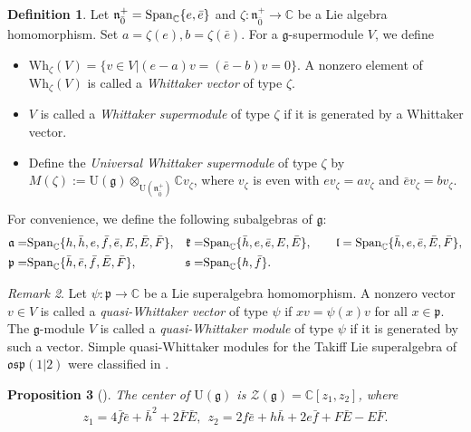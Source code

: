\documentclass[a4paper,10pt]{article}
\theoremstyle{definition}
\newtheorem{definition}{Definition}[section]
\theoremstyle{plain}
\newtheorem{proposition}[definition]{Proposition}
\theoremstyle{remark}
\newtheorem{remark}[definition]{Remark}
\theoremstyle{mystyle}
\numberwithin{equation}{section}
\begin{document}
\begin{definition} 
Let $\mathfrak n_{\bar 0}^+={\rm Span}_{\mathbb C}\{e,\bar e\}$ and $\zeta:\mathfrak n_{\bar 0}^{+}\to \mathbb C$ be a Lie algebra homomorphism. Set $a=\zeta(e),b=\zeta(\bar e)$. For a $\mathfrak g$-supermodule $V$, we define 
\begin{itemize}
    \item $\mathrm{Wh}_{\zeta}(V)=\{v\in V|(e-a)v=(\bar e-b)v=0\}$. A nonzero element of  $\mathrm{Wh}_{\zeta}(V)$ is called a \textit{Whittaker vector} of type $\zeta$.
    \item $V$ is called a \textit{Whittaker supermodule} of type $\zeta$ if it is generated by a Whittaker vector.
    \item Define the \textit{Universal Whittaker supermodule} of type $\zeta$ by $M(\zeta):=\mathrm U(\mathfrak g)\otimes_{\mathrm U(\mathfrak n_{\bar 0}^+)}\mathbb Cv_{\zeta}$, where $v_{\zeta}$ is even with $ev_{\zeta}=av_{\zeta}$ and $\bar ev_{\zeta}=bv_{\zeta}$.
\end{itemize}
\end{definition}
For convenience, we define the following subalgebras of $\mathfrak{g}$:
\begin{align*}
     \mathfrak{a}=&{\rm Span}_\mathbb{C}\{h, \bar{h}, e,\bar{f}, \bar{e},E,\bar{E}, \bar{F}\},
    &\mathfrak{k}=&{\rm Span}_\mathbb{C}\{\bar{h}, e,\bar{e},E, \bar{E}\},\qquad
   \mathfrak{l}={\rm Span}_\mathbb{C}\{\bar{h},e,\bar{e},\bar{E},\bar{F}\},\\
    \mathfrak{p}=&{\rm Span}_\mathbb{C}\{\bar{h},\bar{e},\bar{f},\bar{E},\bar{F}\}, &\mathfrak{s}=&{\rm Span}_\mathbb{C}\{h,\bar{f}\}.
\end{align*}
\begin{remark}
Let $\psi: \mathfrak p\to  \mathbb{C}$ be a Lie superalgebra homomorphism. A nonzero vector $v\in V$ is called a \textit{quasi-Whittaker vector} of type $\psi$ if $xv=\psi(x)v$ for all $x\in \mathfrak p$. The $\mathfrak g$-module $V$ is called a \textit{quasi-Whittaker module} of type $\psi$ if it is generated by such a vector. Simple quasi-Whittaker modules for the Takiff Lie superalgebra of $\mathfrak {osp}(1|2)$ were classified in \cite{C2026}.
\end{remark}

\begin{proposition}[{\cite[Theorem 3.1]{C2026}}]{\label{center}}
The center of $\mathrm{U}(\mathfrak{g})$ is $\mathcal{Z}(\mathfrak{g})=\mathbb{C}[z_1,z_2]$, where
\begin{eqnarray*}
z_1=4\bar{f}\bar{e}+\bar{h}^2+2\bar{F}\bar{E},\ \ z_2=2{f}\bar{e}+h\bar{h}+2{e}\bar{f}+{F}\bar{E}-E\bar{F}.
\end{eqnarray*}
\end{proposition}
\end{document}
